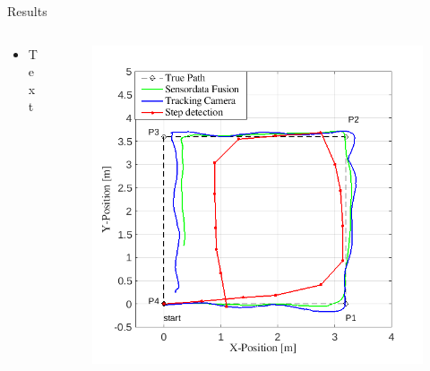 \documentclass[aspectratio=1609]{beamer}
\begin{document}
{	\begin{frame}{Results}
		\begin{columns}
			\begin{column}{0.45\textwidth}
				\begin{itemize}
					\item Text
				\end{itemize}
			\end{column}
			\begin{column}{0.54\textwidth}
				\begin{figure}
					\centering
					\includegraphics[width=0.9\linewidth]{../Conference_Paper/Path}
					\caption{}
					\label{fig:path}
				\end{figure}
			\end{column}
					
			
		\end{columns}
	\end{frame}
	
}
\end{document}
